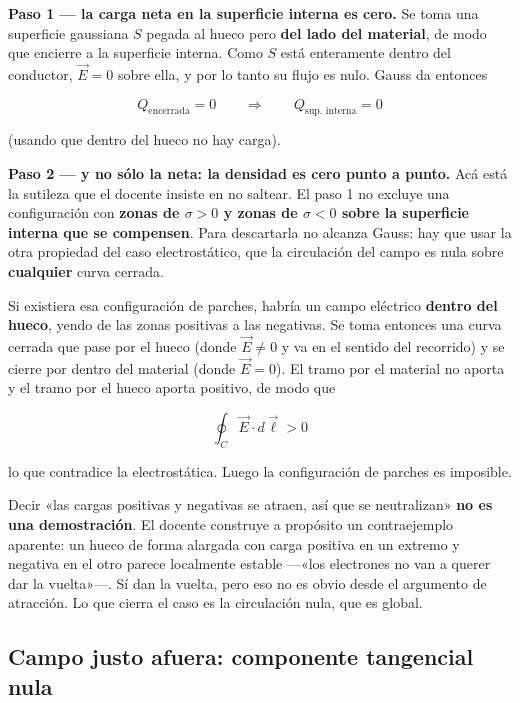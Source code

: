 \documentclass[12pt,a4paper]{article}
\begin{document}
\textbf{Paso 1 --- la carga neta en la superficie interna es cero.} Se toma una
superficie gaussiana $S$ pegada al hueco pero \textbf{del lado del material}, de
modo que encierre a la superficie interna. Como $S$ está enteramente dentro del
conductor, $\vec E = 0$ sobre ella, y por lo tanto su flujo es nulo. Gauss da
entonces

\[
Q_{\text{encerrada}} = 0
\qquad\Longrightarrow\qquad
Q_{\text{sup. interna}} = 0
\]

(usando que dentro del hueco no hay carga).

\textbf{Paso 2 --- y no sólo la neta: la densidad es cero punto a punto.} Acá
está la sutileza que el docente insiste en no saltear. El paso 1 no excluye una
configuración con \textbf{zonas de $\sigma>0$ y zonas de $\sigma<0$ sobre la
superficie interna que se compensen}. Para descartarla no alcanza Gauss: hay que
usar la otra propiedad del caso electrostático, que la circulación del campo es
nula sobre \textbf{cualquier} curva cerrada.

Si existiera esa configuración de parches, habría un campo eléctrico
\textbf{dentro del hueco}, yendo de las zonas positivas a las negativas. Se toma
entonces una curva cerrada que pase por el hueco (donde $\vec E \neq 0$ y va en el
sentido del recorrido) y se cierre por dentro del material (donde $\vec E = 0$).
El tramo por el material no aporta y el tramo por el hueco aporta positivo, de
modo que

\[
\oint_C \vec E\cdot d\vec\ell > 0
\]

lo que contradice la electrostática. Luego la configuración de parches es
imposible.

\begin{warnbox}
Decir «las cargas positivas y negativas se atraen, así que se neutralizan»
\textbf{no es una demostración}. El docente construye a propósito un
contraejemplo aparente: un hueco de forma alargada con carga positiva en un
extremo y negativa en el otro parece localmente estable ---«los electrones no van
a querer dar la vuelta»---. Sí dan la vuelta, pero eso no es obvio desde el
argumento de atracción. Lo que cierra el caso es la circulación nula, que es
global.
\end{warnbox}

\subsection{Campo justo afuera: componente tangencial nula}
\end{document}

